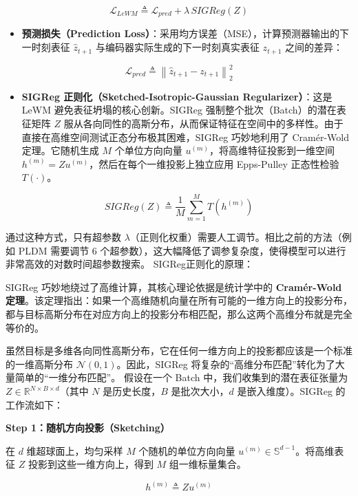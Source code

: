\[
\mathcal{L}_{LeWM} \triangleq \mathcal{L}_{pred} + \lambda\,SIGReg(Z)
\]

\begin{itemize}
\tightlist
\item
  \textbf{预测损失（Prediction Loss）}：采用均方误差（MSE），计算预测器输出的下一时刻表征 \(\hat{z}_{t+1}\) 与编码器实际生成的下一时刻真实表征 \(z_{t+1}\) 之间的差异：
\end{itemize}

\[
\mathcal{L}_{pred} \triangleq \left\|\hat{z}_{t+1}-z_{t+1}\right\|_2^2
\]

\begin{itemize}
\tightlist
\item
  \textbf{SIGReg 正则化（Sketched-Isotropic-Gaussian Regularizer）}：这是 LeWM 避免表征坍塌的核心创新。SIGReg 强制整个批次（Batch）的潜在表征矩阵 \(Z\) 服从各向同性的高斯分布，从而保证特征在空间中的多样性。由于直接在高维空间测试正态分布极其困难，SIGReg 巧妙地利用了 Cramér-Wold 定理。它随机生成 \(M\) 个单位方向向量 \(u^{(m)}\)，将高维特征投影到一维空间 \(h^{(m)} = Zu^{(m)}\)，然后在每个一维投影上独立应用 Epps-Pulley 正态性检验 \(T(\cdot)\)。
\end{itemize}

\[
SIGReg(Z) \triangleq \frac{1}{M}\sum_{m=1}^{M} T(h^{(m)})
\]

通过这种方式，只有超参数 \(\lambda\)（正则化权重）需要人工调节。相比之前的方法（例如 PLDM 需要调节 \(6\) 个超参数），这大幅降低了调参复杂度，使得模型可以进行非常高效的对数时间超参数搜索。
SIGReg正则化的原理：

SIGReg 巧妙地绕过了高维计算，其核心理论依据是统计学中的 \textbf{Cramér-Wold 定理}。该定理指出：如果一个高维随机向量在所有可能的一维方向上的投影分布，都与目标高斯分布在对应方向上的投影分布相匹配，那么这两个高维分布就是完全等价的。

虽然目标是多维各向同性高斯分布，它在任何一维方向上的投影都应该是一个标准的一维高斯分布 \(\mathcal{N}(0,1)\)。因此，SIGReg 将复杂的``高维分布匹配''转化为了大量简单的``一维分布匹配''。
假设在一个 Batch 中，我们收集到的潜在表征张量为 \(Z \in \mathbb{R}^{N\times B\times d}\)（其中 \(N\) 是历史长度，\(B\) 是批次大小，\(d\) 是嵌入维度）。SIGReg 的工作流如下：

\textbf{Step 1：随机方向投影（Sketching）}

在 \(d\) 维超球面上，均匀采样 \(M\) 个随机的单位方向向量 \(u^{(m)} \in \mathbb{S}^{d-1}\)。将高维表征 \(Z\) 投影到这些一维方向上，得到 \(M\) 组一维标量集合。

\[
h^{(m)} \triangleq Zu^{(m)}
\]

